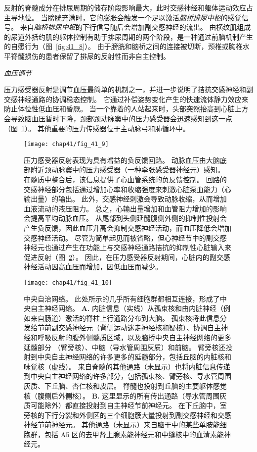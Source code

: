 反射的脊髓成分在排尿周期的储存阶段影响最大，此时交感神经和躯体运动效应占主导地位。
当膀胱充满时，它的膨胀会触发一个足以激活\textit{脑桥排尿中枢}的感觉信号。
来自\textit{脑桥排尿中枢}的下行信号随后会增加副交感神经的流出。
由横纹肌组成的尿道外括约肌的躯体控制有助于排尿周期的两个阶段，是一种通过前脑机制产生的自愿行为（图~\ref{fig:41_8}）。
由于膀胱和脑桥之间的连接被切断，颈椎或胸椎水平脊髓损伤的患者保留了排尿的反射性而非自主控制。


\textit{血压调节}

压力感受器反射是调节血压最简单的机制之一，并进一步说明了拮抗交感神经和副交感神经通路的协调稳态控制。
它通过补偿姿势变化产生的快速流体静力效应来防止体位性低血压和昏厥。
当一个靠着的人站起来时，头部突然抬高到心脏上方会导致脑血压暂时下降，颈部颈动脉窦中的压力感受器会迅速感知到这一点（图~\ref{fig:41_9}）。
其他重要的压力传感器位于主动脉弓和肺循环中。


\begin{figure}[htbp]
	\centering
	\texttt{[image: chap41/fig\_41\_9]}
	\caption{压力感受器反射表现为具有增益的负反馈回路。
		动脉血压由大脑底部附近颈动脉窦中的压力感受器（一种牵张感受器神经元）感知。
		在髓质中整合后，该信息提供了心血管系统的负反馈控制。
		回路的交感神经部分包括通过增加心率和收缩强度来刺激心脏泵血能力（心输出量）的输出。
		此外，交感神经刺激会导致动脉收缩，从而增加血液流动的液压阻力。
		总之，心输出量增加和血管阻力增加的影响会提高平均动脉血压。
		从尾部到头侧延髓腹侧外侧的抑制性投射会产生负反馈，因此血压升高会抑制交感神经活动，而血压降低会增加交感神经活动。
		尽管为简单起见而被省略，但心神经节中的副交感神经元也通过产生在功能上与交感神经通路拮抗的抑制性心脏输入来促进反射（图~\ref{fig:41_10}）。
		因此，在压力感受器反射期间，心脏内的副交感神经活动因高血压而增加，因低血压而减少。}
	\label{fig:41_9}
\end{figure}


\begin{figure}[htbp]
	\centering
	\texttt{[image: chap41/fig\_41\_10]}
	\caption{中央自治网络。
		此处所示的几乎所有细胞群都相互连接，形成了中央自主神经网络。
		\textbf{A.} 内脏信息（实线）从孤束核和由内脏神经（例如来自肠道）激活的脊柱上行通路分布到大脑。
		孤束核将此信息分发给节前副交感神经元（背侧运动迷走神经核和疑核）、协调自主神经和呼吸反射的腹外侧髓质区域，以及脑桥中央自主神经网络的更多延髓部分 （臂旁核）、中脑（导水管周围灰质）和前脑。
		臂旁核还投射到中央自主神经网络的许多更多的延髓部分，包括丘脑的内脏核和味觉核（虚线）。
		来自脊髓的其他通路（未显示）也将内脏信息传递到中央自主神经网络的许多部分，包括孤束核、臂旁核、导水管周围灰质、下丘脑、杏仁核和皮层。
		脊髓也投射到丘脑的主要躯体感觉核（腹侧后外侧核）。
		\textbf{B.} 这里显示的所有传出通路（导水管周围灰质可能除外）都直接投射到自主神经节前神经元。
		在下丘脑中，室旁核的下行分裂和外侧区的三个细胞簇大量投射到副交感神经和交感神经节前神经元。
		其他通路（未显示）来自脑干中的某些单胺能细胞群，包括 A5 区的去甲肾上腺素能神经元和中缝核中的血清素能神经元。}
	\label{fig:41_10}
\end{figure}


